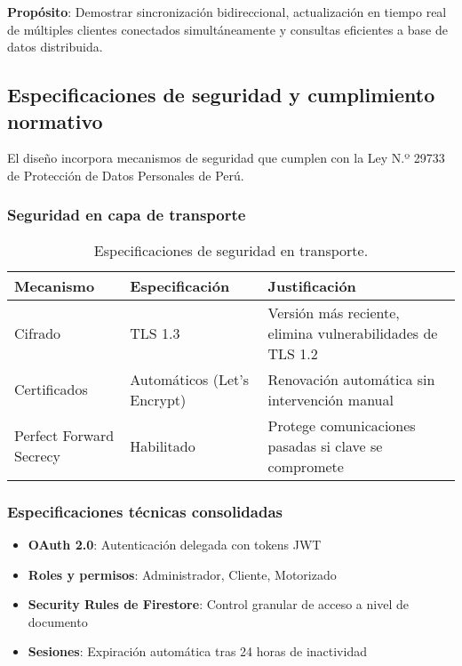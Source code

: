 \textbf{Propósito}: Demostrar sincronización bidireccional, actualización en tiempo real de múltiples clientes conectados simultáneamente y consultas eficientes a base de datos distribuida.

\subsection{Especificaciones de seguridad y cumplimiento normativo}

El diseño incorpora mecanismos de seguridad que cumplen con la Ley N.º 29733 de Protección de Datos Personales de Perú.

\subsubsection{Seguridad en capa de transporte}

\begin{table}[H]
\centering
\caption{Especificaciones de seguridad en transporte.}
\label{tab:seguridad_transporte}
\begin{tabular}{@{}p{4cm}p{3.5cm}p{5.5cm}@{}}
\toprule
\textbf{Mecanismo} & \textbf{Especificación} & \textbf{Justificación} \\
\midrule
Cifrado & TLS 1.3 & Versión más reciente, elimina vulnerabilidades de TLS 1.2 \\
\midrule
Certificados & Automáticos (Let's Encrypt) & Renovación automática sin intervención manual \\
\midrule
Perfect Forward Secrecy & Habilitado & Protege comunicaciones pasadas si clave se compromete \\
\bottomrule
\end{tabular}
\end{table}

\subsubsection{Especificaciones técnicas consolidadas}

\begin{itemize}
    \item \textbf{OAuth 2.0}: Autenticación delegada con tokens JWT
    \item \textbf{Roles y permisos}: Administrador, Cliente, Motorizado
    \item \textbf{Security Rules de Firestore}: Control granular de acceso a nivel de documento
    \item \textbf{Sesiones}: Expiración automática tras 24 horas de inactividad
\end{itemize}

